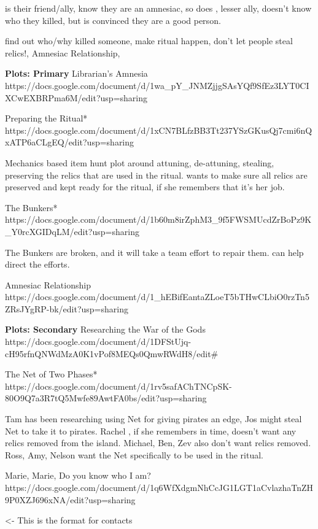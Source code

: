 \documentclass[char]{GL2020}
\begin{document}
\cEthics{} is their friend/ally, know they are an amnesiac, so does \cInterpol{}, lesser ally, doesn't know who they killed, but is convinced they are a good person.

find out who/why killed someone, make ritual happen, don't let people steal relics!, Amnesiac Relationship, 


\textbf{Plots: Primary}
Librarian’s Amnesia
https://docs.google.com/document/d/1wa_pY_JNMZjjgSAsYQf9SfEz3LYT0CIXCwEXBRPma6M/edit?usp=sharing

Preparing the Ritual*
https://docs.google.com/document/d/1xCN7BLfzBB3Tt237YSzGKusQj7cmi6nQxATP6aCLgEQ/edit?usp=sharing

Mechanics based item hunt plot around attuning, de-attuning, stealing, preserving the relics that are used in the ritual.  \cLibrarian{} wants to make sure all relics are preserved and kept ready for the ritual, if she remembers that it's her job. 

The Bunkers*
https://docs.google.com/document/d/1b60m8irZphM3_9f5FWSMUcdZrBoPz9K_Y0rcXGIDqLM/edit?usp=sharing

The Bunkers are broken, and it will take a team effort to repair them.  \cLibrarian{} can help direct the efforts.

Amnesiac Relationship
https://docs.google.com/document/d/1_hEBifEantaZLoeT5bTHwCLbiO0rzTn5ZRsJYgRP-bk/edit?usp=sharing


\textbf{Plots: Secondary}
Researching the War of the Gods
https://docs.google.com/document/d/1DFStUjq-cH95rfnQNWdMzA0K1vPof8MEQs0QmwRWdH8/edit#

The Net of Two Phases*
https://docs.google.com/document/d/1rv5safAChTNCpSK-80O9Q7a3R7tQ5Mwfe89AwtFA0bs/edit?usp=sharing

Tam \cPirate{} has been researching using Net for giving pirates an edge, Jos \cPirateChild{} might steal Net to take it to pirates.  Rachel \cLibrarian{}, if she remembers in time, doesn't want any relics removed from the island.  Michael, Ben, Zev also don't want relics removed.  Ross, Amy, Nelson want the Net specifically to be used in the ritual.

Marie, Marie, Do you know who I am?
https://docs.google.com/document/d/1q6WfXdgmNhCcJG1LGT1aCvlazhaTnZH9P0XZJ696xNA/edit?usp=sharing


\begin{itemz}[Goals]
	\item 
\end{itemz}

\begin{itemz}[Notes]
	\item 
\end{itemz}

\begin{contacts}
	\contact{\cTest{}} <- This is the format for contacts 
\end{contacts}
\end{document}
